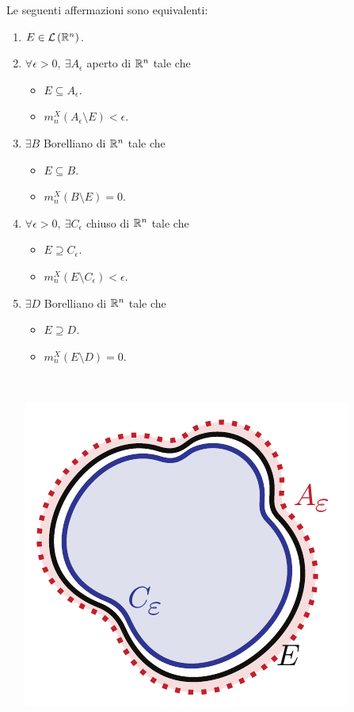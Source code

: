 \begin{theorema}\label{regolaritàlebesgue}
	Le seguenti affermazioni sono equivalenti:
	\begin{enumerate}
		\item $E\in\mathcal{L}\left(\mathbb{R}^n\right)$.
		\item $\forall \epsilon > 0,\ \exists A_{\epsilon}$ aperto di $\mathbb{R}^n$ tale che
		\begin{itemize}
			\item $E\subseteq A_{\epsilon}$.
			\item $m^{X}_n\left(A_{\epsilon}\setminus E\right)<\epsilon$.
		\end{itemize}
		\item $\exists B$ Borelliano di $\mathbb{R}^n$ tale che
	\begin{itemize}
		\item $E\subseteq B$.
		\item $m^{X}_n\left(B\setminus E\right)=0$.
	\end{itemize}
	\item $\forall \epsilon > 0,\ \exists C_{\epsilon}$ chiuso di $\mathbb{R}^n$ tale che
	\begin{itemize}
		\item $E\supseteq C_{\epsilon}$.
		\item $m^{X}_n\left(E\setminus C_{\epsilon}\right)<\epsilon$.
	\end{itemize}
	\item $\exists D$ Borelliano di $\mathbb{R}^n$ tale che
	\begin{itemize}
		\item $E\supseteq D$.
		\item $m^{X}_n\left(E\setminus D\right)=0$.
	\end{itemize}~\\
	\begin{minipage}{0.4\textwidth}
	\begin{center}
		\includegraphics[trim=0cm 0cm 0cm 0cm, clip, scale=0.7]{images/regolarita1}\\

\end{center}
\end{minipage}
\end{enumerate}
\end{theorema}
